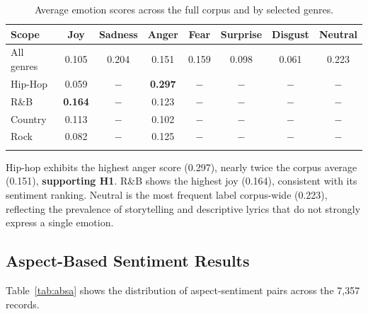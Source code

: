 \documentclass[pdflatex,sn-mathphys-num]{sn-jnl}
\begin{document}
\begin{table}[h]
\caption{Average emotion scores across the full corpus and by selected genres.}\label{tab:emotion}
\begin{tabular}{@{}lccccccc@{}}
\toprule
\textbf{Scope} & \textbf{Joy} & \textbf{Sadness} & \textbf{Anger} & \textbf{Fear} & \textbf{Surprise} & \textbf{Disgust} & \textbf{Neutral} \\
\midrule
All genres & 0.105 & 0.204 & 0.151 & 0.159 & 0.098 & 0.061 & 0.223 \\
\midrule
Hip-Hop    & 0.059 & $-$ & \textbf{0.297} & $-$ & $-$ & $-$ & $-$ \\
R\&B       & \textbf{0.164} & $-$ & 0.123 & $-$ & $-$ & $-$ & $-$ \\
Country    & 0.113 & $-$ & 0.102 & $-$ & $-$ & $-$ & $-$ \\
Rock       & 0.082 & $-$ & 0.125 & $-$ & $-$ & $-$ & $-$ \\
\botrule
\end{tabular}
\end{table}

Hip-hop exhibits the highest anger score (0.297), nearly twice the corpus average (0.151), \textbf{supporting H1}. R\&B shows the highest joy (0.164), consistent with its sentiment ranking. Neutral is the most frequent label corpus-wide (0.223), reflecting the prevalence of storytelling and descriptive lyrics that do not strongly express a single emotion.

\subsection{Aspect-Based Sentiment Results}\label{subsec11}

Table~\ref{tab:absa} shows the distribution of aspect-sentiment pairs across the 7,357 records.
\end{document}
